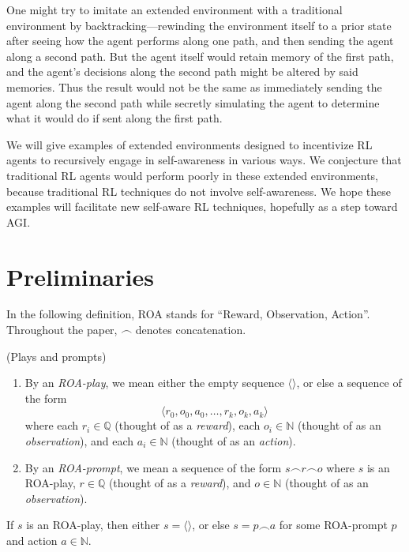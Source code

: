 \documentclass[runningheads]{llncs}
\begin{document}
One might try to imitate an extended environment with a traditional environment by
backtracking---rewinding the environment itself to a prior state after seeing how the
agent performs along one path, and then sending the agent along a second path.
But the agent itself would retain memory of the first path, and the agent's decisions
along the second path might be altered by said memories. Thus the result would not be
the same as immediately sending the agent along the second path while secretly simulating
the agent to determine what it would do if sent along the first path.

We will give examples of
extended environments designed to incentivize RL agents to
recursively engage in self-awareness in various ways.
We conjecture that traditional RL agents would perform poorly in these extended
environments, because traditional RL techniques do not involve
self-awareness. We hope these examples will facilitate
new self-aware RL techniques, hopefully as a step toward AGI.

\section{Preliminaries}

In the following definition, ROA stands for ``Reward, Observation, Action''.
Throughout the paper, $\frown$ denotes concatenation.

\begin{definition}
(Plays and prompts)
    \begin{enumerate}
        \item
        By an \emph{ROA-play}, we mean either the empty sequence $\langle\rangle$,
        or else a sequence of the form
        \[
            \langle r_0,o_0,a_0,\ldots,r_k,o_k,a_k\rangle
        \]
        where each $r_i\in\mathbb Q$ (thought of as a \emph{reward}),
        each $o_i\in\mathbb N$ (thought of as an \emph{observation}),
        and each $a_i\in \mathbb N$ (thought of as an \emph{action}).
        \item
        By an \emph{ROA-prompt}, we mean a sequence of the form
        $s\frown r\frown o$
        where $s$ is an ROA-play,
        $r\in\mathbb Q$ (thought of as a \emph{reward}),
        and $o\in\mathbb N$ (thought of as an \emph{observation}).
    \end{enumerate}
\end{definition}

\begin{lemma}
\label{roaplaydecompositionlemma}
    If $s$ is an ROA-play, then either $s=\langle\rangle$, or else
    $s=p\frown a$ for some ROA-prompt $p$ and action $a\in\mathbb N$.
\end{lemma}
\end{document}
